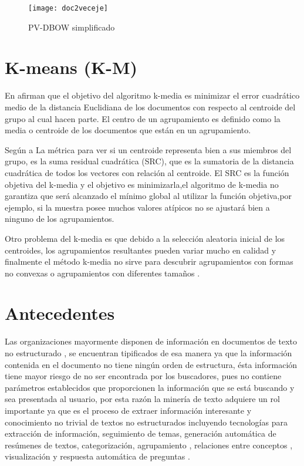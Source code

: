 \begin{figure}[H]
\texttt{[image: doc2veceje]}
\caption{ PV-DBOW simplificado \cite{le2014distributed}}
\label{doc2veceje}
\end{figure}






\section{K-means (K-M)}

En \cite{manning2010introduction} afirman que el objetivo del algoritmo k-media
es minimizar el error cuadrático medio de la distancia Euclidiana de los documentos con respecto al centroide del grupo 
al cual hacen parte. El centro de un agrupamiento es definido como la media o centroide de los documentos que están en un agrupamiento.

Según \cite{witten2016data} a La métrica para ver si un centroide representa bien a sus miembros del grupo,
es la suma residual cuadrática (SRC), 
que es la sumatoria de la distancia cuadrática de todos los vectores con relación al centroide.
El SRC es la función objetiva del k-media y el objetivo es minimizarla,el algoritmo de k-media no garantiza que 
será alcanzado el mínimo global al utilizar la función objetiva,por ejemplo, si la muestra posee 
muchos valores atípicos no se ajustará bien a ninguno de los agrupamientos.

Otro problema del k-media es que debido a la selección aleatoria inicial de los centroides, 
los agrupamientos resultantes pueden variar mucho en calidad y finalmente el método k-media no sirve
para descubrir agrupamientos con formas no convexas o agrupamientos con diferentes tamaños \cite{wang2011new}.



\section{Antecedentes}

Las organizaciones mayormente disponen de información en documentos de texto no estructurado ,
se encuentran tipificados de esa manera ya que la información contenida en el documento no tiene ningún orden de estructura, ésta
información tiene mayor riesgo de no ser encontrada por los buscadores, pues no contiene parámetros establecidos que proporcionen
la información que se está buscando y sea presentada al usuario, por esta razón la minería de texto adquiere un rol importante
ya que es el proceso de extraer información interesante y conocimiento no trivial de textos no estructurados incluyendo tecnologías 
para extracción de información, seguimiento de temas, generación automática de resúmenes de textos, categorización,
agrupamiento , relaciones entre conceptos , visualización y respuesta automática de preguntas .  

